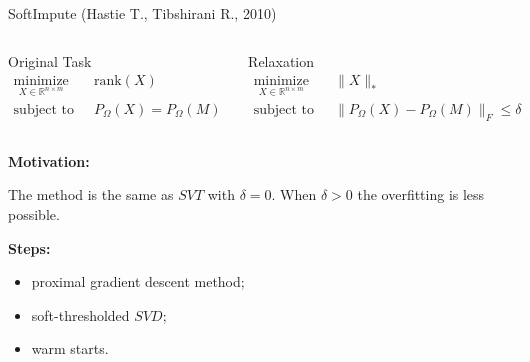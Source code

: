 \documentclass{beamer}
\begin{document}
\begin{frame}{SoftImpute (Hastie T., Tibshirani R., 2010)}
	\begin{columns}[c]
		\begin{block}{Original Task}
			\vspace{-0.5cm}
			\begin{align*}
			\mathop{\text{minimize}}\limits_{X \in \mathbb{R}^{n \times m}} \quad & 
			\text{rank} (X) \\
			\text{subject to} \quad & P_{\Omega} (X) = P_{\Omega} (M)
			\end{align*}
		\end{block}
		
		\begin{block}{Relaxation}
			\vspace{-0.5cm}
			\begin{align*}
			\mathop{\text{minimize}}\limits_{X \in \mathbb{R}^{n \times m}} \quad & 
			\| X \|_* \\
			\text{subject to} \, & \| P_{\Omega} (X) - P_{\Omega} (M) \|_F \leq \delta
			\end{align*}
		\end{block}
	\end{columns}
\vspace{0.3cm}
\textbf{Motivation:}
	
	The method is the same as $SVT$ with $\delta = 0$. When $\delta>0$ the overfitting is less possible.
	
\vspace{0.3cm}
\textbf{Steps:}
\begin{itemize}
	\item proximal gradient descent method;
	\item soft-thresholded $SVD$;
	\item warm starts.
\end{itemize}

\end{frame}
\end{document}
